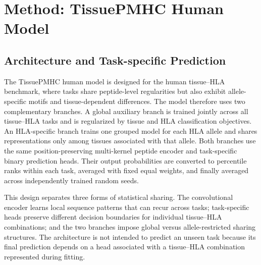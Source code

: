 \section{Method: TissuePMHC Human Model}

\subsection{Architecture and Task-specific Prediction}

The TissuePMHC human model is designed for the human tissue--HLA benchmark, where tasks share peptide-level regularities but also exhibit allele-specific motifs and tissue-dependent differences. The model therefore uses two complementary branches. A global auxiliary branch is trained jointly across all tissue--HLA tasks and is regularized by tissue and HLA classification objectives. An HLA-specific branch trains one grouped model for each HLA allele and shares representations only among tissues associated with that allele. Both branches use the same position-preserving multi-kernel peptide encoder and task-specific binary prediction heads. Their output probabilities are converted to percentile ranks within each task, averaged with fixed equal weights, and finally averaged across independently trained random seeds.

This design separates three forms of statistical sharing. The convolutional encoder learns local sequence patterns that can recur across tasks; task-specific heads preserve different decision boundaries for individual tissue--HLA combinations; and the two branches impose global versus allele-restricted sharing structures. The architecture is not intended to predict an unseen task because its final prediction depends on a head associated with a tissue--HLA combination represented during fitting.

